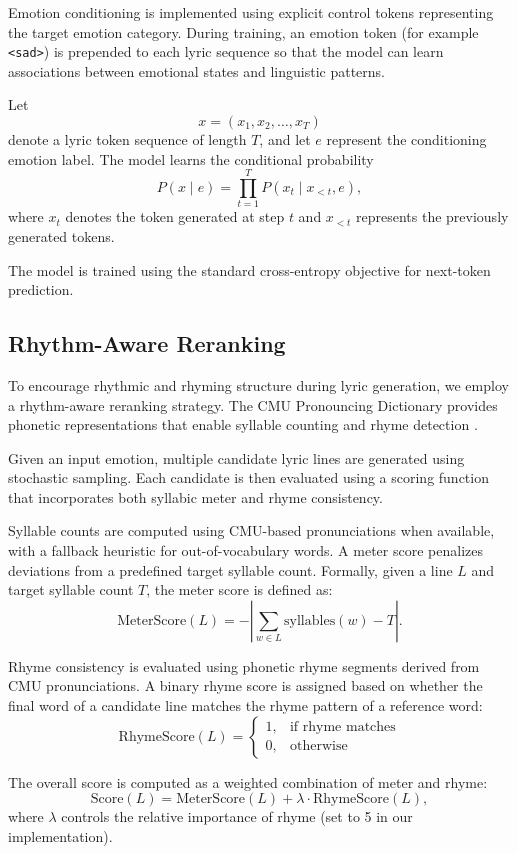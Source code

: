\documentclass[11pt]{article}
\begin{document}
Emotion conditioning is implemented using explicit control tokens representing the target emotion category. During training, an emotion token (for example \texttt{\textless sad\textgreater}) is prepended to each lyric sequence so that the model can learn associations between emotional states and linguistic patterns.

Let
\[
x = (x_1, x_2, \dots, x_T)
\]
denote a lyric token sequence of length $T$, and let $e$ represent the conditioning emotion label. The model learns the conditional probability
\[
P(x \mid e)
=
\prod_{t=1}^{T}
P(x_t \mid x_{<t}, e),
\]
where $x_t$ denotes the token generated at step $t$ and $x_{<t}$ represents the previously generated tokens.

The model is trained using the standard cross-entropy objective for next-token prediction.

\subsection{Rhythm-Aware Reranking}

To encourage rhythmic and rhyming structure during lyric generation, we employ a rhythm-aware reranking strategy. The CMU Pronouncing Dictionary provides phonetic representations that enable syllable counting and rhyme detection \cite{cmudict}.

Given an input emotion, multiple candidate lyric lines are generated using stochastic sampling. Each candidate is then evaluated using a scoring function that incorporates both syllabic meter and rhyme consistency.

Syllable counts are computed using CMU-based pronunciations when available, with a fallback heuristic for out-of-vocabulary words. A meter score penalizes deviations from a predefined target syllable count. Formally, given a line $L$ and target syllable count $T$, the meter score is defined as:
\[
\text{MeterScore}(L) = - \left| \sum_{w \in L} \text{syllables}(w) - T \right|.
\]

Rhyme consistency is evaluated using phonetic rhyme segments derived from CMU pronunciations. A binary rhyme score is assigned based on whether the final word of a candidate line matches the rhyme pattern of a reference word:
\[
\text{RhymeScore}(L) =
\begin{cases}
1, & \text{if rhyme matches} \\
0, & \text{otherwise}
\end{cases}
\]

The overall score is computed as a weighted combination of meter and rhyme:
\[
\text{Score}(L) = \text{MeterScore}(L) + \lambda \cdot \text{RhymeScore}(L),
\]
where $\lambda$ controls the relative importance of rhyme (set to 5 in our implementation).
\end{document}
